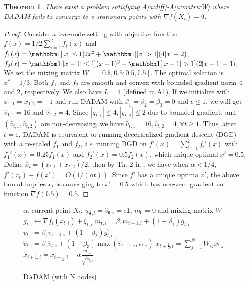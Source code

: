 \documentclass{article} %
\newtheorem{theorem}{Theorem}
\begin{document}
\begin{theorem}\label{thm: dadam_diverge}
There exist a problem satisfying A\ref{a:diff}-A\ref{a:matrixW} where DADAM fails to converge to a stationary points with $\nabla f(\bar X_t) = 0$.   
\end{theorem}
\begin{proof}
Consider a two-node setting with objective function $f(x) =1/2 \sum_{i=1}^2 f_i(x)$ and $f_1(x) =  \mathbbm 1[|x|\leq 1] 2x^2 +  \mathbbm 1[|x|> 1] (4|x|-2)$, $f_2(x) =  \mathbbm 1[|x-1|\leq 1](x-1)^2 + \mathbbm 1[|x-1| > 1] (2|x-1|-1)$. We set the mixing matrix  $W = [0.5,0.5;0.5,0.5]$. The optimal solution is $x^* = 1/3$.
Both $f_1$ and $f_2$ are smooth and convex with bounded gradient norm 4 and 2, respectively. 
We also have $L = 4$ (defined in A1). 
If we initialize with $x_{1,1} = x_{1,2} = -1$ and run DADAM with $\beta_1 = \beta_2 =\beta_3 = 0$ and $\epsilon \leq 1$, we will get $\hat v_{1,1} = 16$ and $\hat v_{1,2} = 4$. 
Since $|g_{t,1}| \leq 4, |g_{t,2}| \leq 2$ due to bounded gradient, and $(\hat v_{t,1},\hat v_{t,2})$ are non-decreasing, we have $\hat v_{t,1} = 16, \hat v_{t,2}=4, \forall t \geq 1$. 
Thus, after $t=1$, DADAM is equivalent to running decentralized gradient descent (DGD) \citep{yuan2016convergence} with a re-scaled $f_1$ and $f_2$, \textit{i.e.} running DGD on
$f'(x) = \sum_{i=1}^2 f_i'(x)$ with $f_1'(x) =  0.25 f_1(x)$ and $f_2'(x) = 0.5  f_2(x)$, which unique optimal $x'=0.5$. 
Define $\bar x_t = (x_{t,1}+x_{t,2})/2$, then by Th. 2 in \citet{yuan2016convergence}, we have when $\alpha < 1/4$, $f'(\bar x_t) - f(x') = O(1/(\alpha t))$. 
Since $f'$ has a unique optima $x'$, the above bound implies $\bar x_t$ is converging to $x'=0.5$ which has non-zero gradient on function $\nabla f(0.5) = 0.5$.
\end{proof}
\begin{figure}\vspace{-0.4in}
\begin{minipage}{\linewidth}
\begin{algorithm}[H]
	\caption{DADAM (with N nodes)}
	\label{alg: dadam}
	\begin{algorithmic}[1]
		 $\alpha$, current point $X_t$, $u_{\frac{1}{2},i} = \hat v_{0,i} = \epsilon \mathbf{1}$, $m_0=0$ and mixing matrix $W$
		\STATE  $g_{t,i}  \leftarrow \nabla f_i(x_{t,i}) + \xi_{t,i}$
		\STATE $m_{t,i} = \beta_1 m_{t-1,i} + (1-\beta_1) g_{t,i}$ 
		\STATE $v_{t,i} = \beta_2 v_{t-1,i}+(1-\beta_2)g_{t,i}^2$
		\STATE $\hat v_{t,i} = \beta_3 \hat v_{t,i} + (1-\beta_3) \max(\hat v_{t-1,i},v_{t,i})$
		\STATE $x_{t+\frac{1}{2},i} = \sum_{j=1}^N W_{ij}x_{t,j}$
		\STATE $x_{t+1,i} = x_{t+\frac{1}{2},i} - \alpha \frac{m_{t,i}}{\sqrt{\hat v_{t,i}}}$
		\ENDFAP
		\ENDFOR
	\end{algorithmic}
\end{algorithm}\vspace{-0.1in}
\end{minipage}\end{figure}
\end{document}
